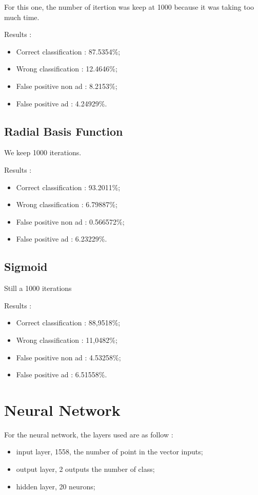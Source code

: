 For this one, the number of itertion was keep at 1000 because it was taking too much time.

Results :
\begin{itemize}
  \item Correct classification : 87.5354\%;
  \item Wrong classification : 12.4646\%;
  \item False positive non ad : 8.2153\%;
  \item False positive ad : 4.24929\%.
\end{itemize}

\subsection{Radial Basis Function}

We keep 1000 iterations.

Results :
\begin{itemize}
  \item Correct classification : 93.2011\%;
  \item Wrong classification : 6.79887\%;
  \item False positive non ad : 0.566572\%;
  \item False positive ad : 6.23229\%.
\end{itemize}

\subsection{Sigmoid}

Still a 1000 iterations

Results :
\begin{itemize}
  \item Correct classification : 88,9518\%;
  \item Wrong classification : 11,0482\%;
  \item False positive non ad : 4.53258\%;
  \item False positive ad : 6.51558\%.
\end{itemize}

\section{Neural Network}
For the neural network, the layers used are as follow :
  \begin{itemize}
    \item input layer, 1558, the number of point in the vector inputs;
    \item output layer, 2 outputs the number of class;
    \item hidden layer, 20 neurons;
  \end{itemize}

